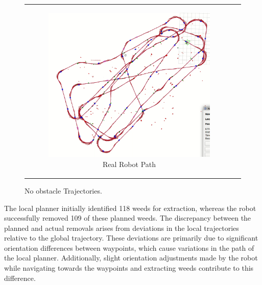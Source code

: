 \begin{figure}[H]
\begin{tabular}{cc}
\begin{subfigure}{0.4\textwidth}
            \includegraphics[width=\textwidth]{Images/real_robot/no_obs_real_path.png}
            \caption{Real Robot Path}
        \end{subfigure}
    \end{tabular}
    \caption{No obstacle Trajectories.\label{fig:no_obs_traj}} 
\end{figure}



\vspace*{6mm}   


The local planner initially identified 118 weeds for extraction, whereas the robot successfully removed 109 of these planned weeds. The discrepancy between the planned and actual removals arises from deviations in the local trajectories relative to the global trajectory. These deviations are primarily due to significant orientation differences between waypoints, which cause variations in the path of the local planner. Additionally, slight orientation adjustments made by the robot while navigating towards the waypoints and extracting weeds contribute to this difference. 


